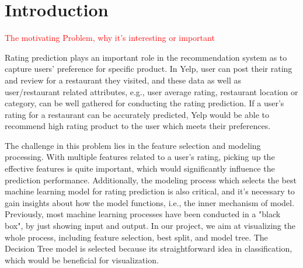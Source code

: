 \section{Introduction}
\label{sec:intro}

\textcolor{red}{The motivating Problem, why it's interesting or important}

Rating prediction plays an important role in the recommendation system as to capture users' preference for specific product. In Yelp, user can post their rating and review for a restaurant they visited, and these data as well as user/restaurant related attributes, e.g., user average rating, restaurant location or category, can be well gathered for conducting the rating prediction. If a user's rating for a restaurant can be accurately predicted, Yelp would be able to recommend high rating product to the user which meets their preferences. 

The challenge in this problem lies in the feature selection and modeling processing. With multiple features related to a user's rating, picking up the effective features is quite important, which would significantly influence the prediction performance. Additionally, the modeling process which selects the best machine learning model for rating prediction is also critical, and it's necessary to gain insights about how the model functions, i.e., the inner mechanism of model. Previously, most machine learning processes have been conducted in a "black box", by just showing input and output. In our project, we aim at visualizing the whole process, including feature selection, best split, and model tree. The Decision Tree model is selected because its straightforward idea in classification, which would be beneficial for visualization. 
